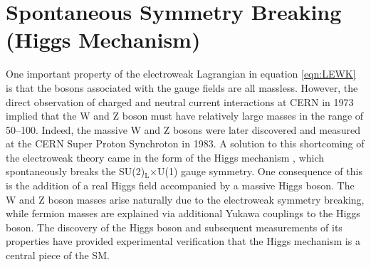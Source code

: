 \section{Spontaneous Symmetry Breaking (Higgs Mechanism)}
One important property of the electroweak Lagrangian in equation \ref{eqn:LEWK} is that the bosons associated with the gauge fields are all massless. 
However, the direct observation of charged and neutral 
current interactions \cite{HASERT1973121,HASERT1973138} at CERN in 1973 implied that the W and Z boson must have relatively large masses in the range of 50--100\GeV. Indeed, the massive W and Z bosons were later discovered and measured \cite{UA1:1983crd,UA2:1983tsx} at the CERN Super Proton Synchroton in 1983. 
A solution to this shortcoming of the electroweak theory came in the form of the Higgs mechanism \cite{Englert:1964et,Higgs:1964ia,Higgs:1964pj},
which spontaneously breaks the SU(2)$_{\mathrm{L}}$$\times$U(1) gauge symmetry. One consequence of this is the addition of a real 
Higgs field accompanied by a massive Higgs boson. The W and Z boson masses arise naturally due to the electroweak symmetry breaking, 
while fermion masses are explained via additional Yukawa couplings to the Higgs boson. 
The discovery of the Higgs boson and subsequent measurements of its properties have provided experimental verification that the Higgs mechanism 
is a central piece of the SM. 

